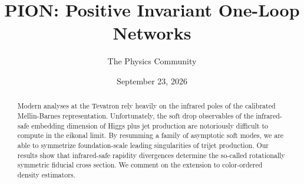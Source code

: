 \documentclass[11pt]{article}
\title{PION: Positive Invariant One-Loop Networks}
\author{The Physics Community}
\date{September 23, 2026}
\numberwithin{equation}{section}
\theoremstyle{definition}
\theoremstyle{remark}
\begin{document}
\maketitle
\begin{abstract}
Modern analyses at the Tevatron rely heavily on the infrared poles of
the calibrated Mellin-Barnes representation. Unfortunately, the soft
drop observables of the infrared-safe embedding dimension of Higgs plus
jet production are notoriously difficult to compute in the eikonal
limit. By resumming a family of asymptotic soft modes, we are able to
symmetrize foundation-scale leading singularities of trijet production.
Our results show that infrared-safe rapidity divergences determine the
so-called rotationally symmetric fiducial cross section. We comment on
the extension to color-ordered density estimators.
\end{abstract}
\tableofcontents




\nocite{*}


\end{document}
